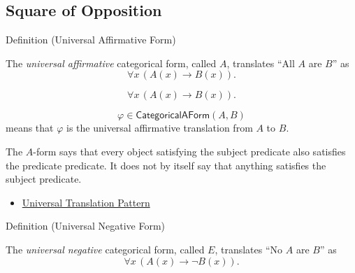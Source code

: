 
\subsection*{Square of Opposition}

\begin{definitionbox}{Definition (Universal Affirmative Form)}
\begin{definition}
\label{def:categorical-a-form-predicate-logic}
The \emph{universal affirmative} categorical form, called \(A\), translates
``All \(A\) are \(B\)'' as
\[
\forall x\,(A(x)\to B(x)).
\]
\end{definition}
\end{definitionbox}

\begin{remark*}
\[
\forall x\,(A(x)\to B(x)).
\]
\end{remark*}

\begin{remark*}
\[
  \varphi\in\mathsf{CategoricalAForm}(A,B)
\] means that \(\varphi\) is the
universal affirmative translation from \(A\) to \(B\).
\end{remark*}

\begin{remark*}[Interpretation]
The \(A\)-form says that every object satisfying the subject predicate also
satisfies the predicate predicate. It does not by itself say that anything
satisfies the subject predicate.
\end{remark*}

\begin{dependencies}
\begin{itemize}
  \item \hyperref[prop:universal-translation-pattern]{Universal Translation Pattern}
\end{itemize}
\end{dependencies}

\begin{definitionbox}{Definition (Universal Negative Form)}
\begin{definition}
\label{def:categorical-e-form-predicate-logic}
The \emph{universal negative} categorical form, called \(E\), translates
``No \(A\) are \(B\)'' as
\[
\forall x\,(A(x)\to \neg B(x)).
\]
\end{definition}
\end{definitionbox}

